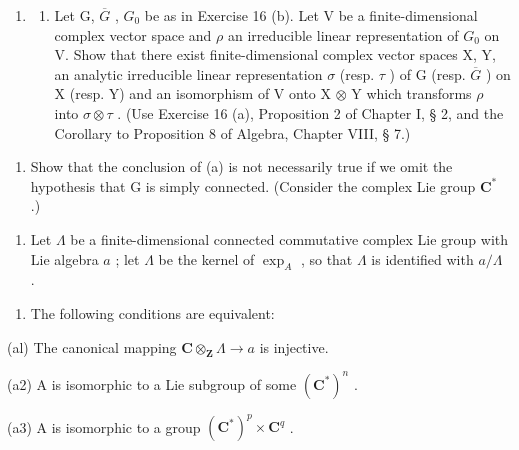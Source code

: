 \begin{enumerate}
\def\labelenumi{\arabic{enumi}.}
\setcounter{enumi}{16}
\tightlist
\item
  \begin{enumerate}
  \def\labelenumii{(\alph{enumii})}
  \tightlist
  \item
    Let G, \(\overline{G}\) , \(G_{0}\) be as in Exercise 16 (b). Let V be a finite-dimensional complex vector space and \(\rho\) an irreducible linear representation of \(G_{0}\) on V. Show that there exist finite-dimensional complex vector spaces X, Y, an analytic irreducible linear representation \(\sigma\) (resp. \(\tau\) ) of G (resp. \(\overline{G}\) ) on X (resp. Y) and an isomorphism of V onto X \(\otimes\) Y which transforms \(\rho\) into \(\sigma \otimes \tau\) . (Use Exercise 16 (a), Proposition 2 of Chapter I, § 2, and the Corollary to Proposition 8 of Algebra, Chapter VIII, § 7.)
  \end{enumerate}
\end{enumerate}

\begin{enumerate}
\def\labelenumi{(\alph{enumi})}
\setcounter{enumi}{1}
\tightlist
\item
  Show that the conclusion of (a) is not necessarily true if we omit the hypothesis that G is simply connected. (Consider the complex Lie group \(\mathbf{C}^*\) .)
\end{enumerate}

\begin{enumerate}
\def\labelenumi{\arabic{enumi}.}
\setcounter{enumi}{17}
\tightlist
\item
  Let \(\Lambda\) be a finite-dimensional connected commutative complex Lie group with Lie algebra \(a\) ; let \(\Lambda\) be the kernel of \(\exp_{A}\) , so that \(\Lambda\) is identified with \(a / \Lambda\) .
\end{enumerate}

\begin{enumerate}
\def\labelenumi{(\alph{enumi})}
\tightlist
\item
  The following conditions are equivalent:
\end{enumerate}

(al) The canonical mapping \(\mathbf{C} \otimes_{\mathbf{Z}} \Lambda \to a\) is injective.

(a2) A is isomorphic to a Lie subgroup of some \((\mathbf{C}^{*})^{n}\) .

(a3) A is isomorphic to a group \((\mathbf{C}^{*})^{p}\times \mathbf{C}^{q}\) .

